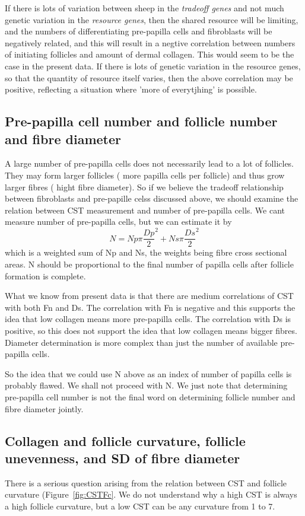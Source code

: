 \documentclass[titlepage]{article}  %
\begin{document}
If there is lots of variation between sheep in the {\em tradeoff genes} and not much genetic variation in the {\em resource genes}, then the shared resource will be limiting, and the numbers of differentiating pre-papilla cells and fibroblasts will be negatively related, and this will result in a negtive correlation between numbers of initiating follicles and amount of dermal collagen. This would seem to be the case in the present data. If there is lots of genetic variation in the resource genes, so that the quantity of resource itself varies, then the above correlation may be positive, reflecting a situation where 'more of everytjhing' is possible. 

\subsection{Pre-papilla cell number and follicle number and fibre diameter}
A large number of pre-papilla cells does not necessarily lead to a lot of follicles. They may form larger follicles ( more papilla cells per follicle) and thus grow larger fibres ( hight fibre diameter).
So if we believe the tradeoff relationship between fibroblasts and pre-papille celss discussed above, we should examine the relation between CST measurement  and number of pre-papilla cells. We cant measure number of pre-papilla cells, but we can estimate it by
\begin{displaymath}
N = Np \pi \frac{Dp}{2}^2 + Ns \pi \frac{Ds}{2}^2
\end{displaymath}
which is a weighted sum of Np and Ns, the weights being fibre cross sectional areas. N should be proportional to the final number of papilla cells after follicle formation is complete.

What we know from present data is that there are medium correlations of CST with both Fn and Ds. The correlation with Fn is negative and this supports the idea that low collagen means more pre-papilla cells. The correlation with Ds is positive, so this does not support the idea that low collagen means bigger fibres. Diameter determination is more complex than just the number of available pre-papilla cells. 

So the idea that we could use N above as an index of number of papilla cells is probably flawed. We shall not proceed with N. We just note that determining pre-papilla cell number is not the final word on determining follicle number and fibre diameter jointly.

\subsection{Collagen and follicle curvature, follicle unevenness, and SD of fibre diameter}
There is a serious  question arising from the relation between CST and follicle curvature (Figure~\ref{fig:CSTFc}. We do not understand why a high CST is always a high follicle curvature, but a low CST can be any curvature from 1 to 7. 
\end{document}
